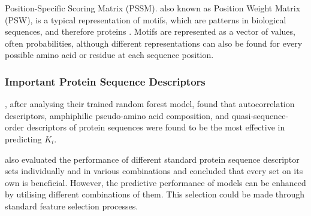 Position-Specific Scoring Matrix (PSSM). also known as Position Weight Matrix (PSW), is a typical representation of motifs, which are patterns in biological sequences, and therefore proteins \citep{Jiang2020, Encyclopedia}. Motifs are represented as a vector of values, often probabilities, although different representations can also be found for every possible amino acid or residue at each sequence position. 

\subsubsection{Important Protein Sequence Descriptors}
\label{subsubsec:Important_Protein_Sequence_Descriptors}

\citet{Shar2016}, after analysing their trained random forest model, found that autocorrelation descriptors, amphiphilic pseudo-amino acid composition, and quasi-sequence-order descriptors of protein sequences were found to be the most effective in predicting $K_i$. 

\citet{Ong2007} also evaluated the performance of different standard protein sequence descriptor sets individually and in various combinations and concluded that every set on its own is beneficial. However, the predictive performance of models can be enhanced by utilising different combinations of them. This selection could be made through standard feature selection processes.



